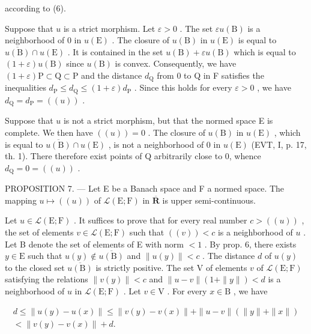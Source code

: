 according to (6).

Suppose that \(u\) is a strict morphism. Let \(\varepsilon > 0\) . The set \(\varepsilon u(\mathrm{B})\) is a neighborhood of 0 in \(u(\mathrm{E})\) . The closure of \(u(\mathrm{B})\) in \(u(\mathrm{E})\) is equal to \(\overline{u(\mathrm{B})} \cap u(\mathrm{E})\) . It is contained in the set \(u(\mathrm{B}) + \varepsilon u(\mathrm{B})\) which is equal to \((1 + \varepsilon)u(\mathrm{B})\) since \(u(\mathrm{B})\) is convex. Consequently, we have \((1 + \varepsilon)\mathrm{P} \subset \mathrm{Q} \subset \mathrm{P}\) and the distance \(d_{\mathrm{Q}}\) from 0 to Q in F satisfies the inequalities \(d_{\mathrm{P}} \leqslant d_{\mathrm{Q}} \leqslant (1 + \varepsilon)d_{\mathrm{P}}\) . Since this holds for every \(\varepsilon > 0\) , we have \(d_{\mathrm{Q}} = d_{\mathrm{P}} = ((u))\) .

Suppose that \(u\) is not a strict morphism, but that the normed space E is complete. We then have \(((u)) = 0\) . The closure of \(u(\mathrm{B})\) in \(u(\mathrm{E})\) , which is equal to \(\overline{u(\mathrm{B})} \cap u(\mathrm{E})\) , is not a neighborhood of 0 in \(u(\mathrm{E})\) (EVT, I, p. 17, th. 1). There therefore exist points of Q arbitrarily close to 0, whence \(d_{\mathrm{Q}} = 0 = ((u))\) .

PROPOSITION 7. --- Let E be a Banach space and F a normed space. The mapping \(u \mapsto ((u))\) of \(\mathcal{L}(\mathrm{E};\mathrm{F})\) in \(\overline{\mathbf{R}}\) is upper semi-continuous.

Let \(u \in \mathcal{L}(\mathrm{E};\mathrm{F})\) . It suffices to prove that for every real number \(c > ((u))\) , the set of elements \(v \in \mathcal{L}(\mathrm{E};\mathrm{F})\) such that \(((v)) < c\) is a neighborhood of \(u\) . Let B denote the set of elements of E with norm \(< 1\) . By prop. 6, there exists \(y \in \mathrm{E}\) such that \(u(y) \notin \overline{u(\mathrm{B})}\) and \(\| u(y)\| < c\) . The distance \(d\) of \(u(y)\) to the closed set \(\overline{u(\mathrm{B})}\) is strictly positive. The set V of elements \(v\) of \(\mathcal{L}(\mathrm{E};\mathrm{F})\) satisfying the relations \(\| v(y)\| < c\) and \(\| u - v\|(1 + \| y\|) < d\) is a neighborhood of \(u\) in \(\mathcal{L}(\mathrm{E};\mathrm{F})\) . Let \(v \in \mathrm{V}\) . For every \(x \in \mathrm{B}\) , we have

\[
\begin{array}{c} d \leqslant \| u (y) - u (x) \| \leqslant \| v (y) - v (x) \| + \| u - v \| (\| y \| + \| x \|) \\ <   \| v (y) - v (x) \| + d. \end{array}
\]

